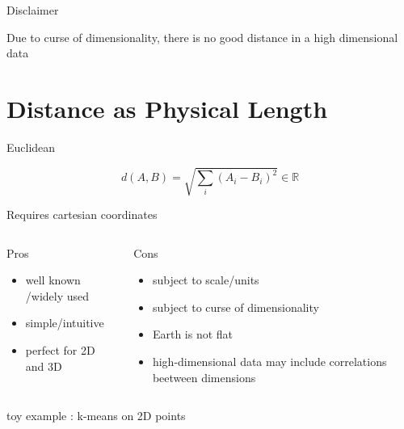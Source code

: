 \documentclass{beamer}
\begin{document}
\begin{frame}{Disclaimer}


Due to \alert{curse of dimensionality}, there is no good distance in a high dimensional data
\end{frame}


\section{Distance as Physical Length}


\begin{frame}{Euclidean}

$$d(A,B)= \sqrt{\sum_{i}(A_i-B_i)^2} \in \mathbb{R}$$

\begin{scriptsize}

Requires \alert{cartesian coordinates} 



\begin{columns}[T,onlytextwidth]
\begin{block}{Pros}
\begin{itemize}
  \item well known /widely used
  \item simple/intuitive
  \item perfect for 2D and 3D 
\end{itemize}
\end{block}
\begin{block}{Cons}
\begin{spacing}{0.9}
\begin{itemize}
  \item subject to scale/units 
  \item subject to curse of dimensionality 
  \item Earth is not flat
  \item high-dimensional data may include correlations beetween dimensions
\end{itemize}
\end{spacing}
\end{block}
\end{columns}


toy example : k-means on 2D points 
\end{scriptsize}

\end{frame}
\end{document}
